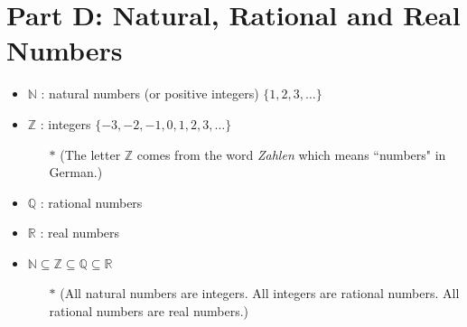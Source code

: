 \documentclass[]{report}
\begin{document}
\newpage





\section*{Part D: Natural, Rational and Real Numbers}
\begin{framed}
\begin{itemize}
\item $\mathbb{N}$ : natural numbers (or positive integers) $\{1,2,3,\ldots\}$
\item $\mathbb{Z}$ : integers $\{-3,-2,-1,0,1,2,3,\ldots\}$
\begin{itemize}
\item[$\ast$] (The letter $\mathbb{Z}$ comes from the word \emph{Zahlen} which means ``numbers" in German.)
\end{itemize}
\item $\mathbb{Q}$ : rational numbers
\item $\mathbb{R}$ : real numbers
\item $\mathbb{N} \subseteq \mathbb{Z } \subseteq \mathbb{Q} \subseteq \mathbb{R}$
\begin{itemize}
\item[$\ast$] (All natural numbers are integers. All integers are rational numbers. All rational numbers are real numbers.)
\end{itemize}
\end{itemize}
\end{framed}
\end{document}
